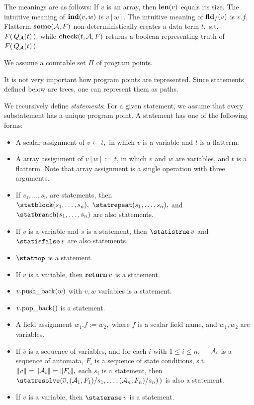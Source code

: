 \noindent
The meanings are as follows: If $ v $ is an array, then $ {\bf len}(v) $
equals its size. The intuitive meaning of $ {\bf ind}(v,w) $ is $ v[w]. $
The intuitive meaning of $ {\bf fld}_f(v) $ is $ v.f. $
Flatterm $ {\bf some}( {\cal A}, F ) $ non-deterministically creates a
data term $ t, $ s.t. $ F( \, Q_{\cal A}(t) \, ), $ while
$ {\bf check}( t, {\cal A}, F ) $ returns a boolean representing
truth of $ F( \, Q_{\cal A}(t) \, ). $
\begin{definition}
   \label{Def_program_point}
   We assume a countable set $ \Pi $ of program points.
\end{definition}
It is not very important how program points are represented.
Since statements defined below are trees, one can represent them as
paths.
\begin{definition}
   \label{Def_statement}
   We recursively define \emph{statements}:
   For a given statement, we assume that every substatement
   has a unique program point.
   A statement has one of the following forms:
   \begin{itemize}
   \item
      A scalar assignment of $ v \leftarrow t, $ in which $ v $ is a variable
      and $ t $ is a flatterm.
   \item
      A array assignment of $ v[w] := t $, in which
      $ v $ and $ w $ are variables,
      and $ t $ is a flatterm.
      Note that array assignment is a single operation
      with three arguments.
   \item
      If $ s_1, \ldots, s_n $ are statements, then
      $ \statblock(s_1, \ldots, s_n), \
        \statrepeat(s_1, \ldots, s_n), $ and 
        $ \statbranch(s_1, \ldots, s_n) $ are also statements.
   \item
      If $ v $ is a variable and
      $ s $ is a statement, then
      $ \statistrue \, v $ and $ \statisfalse \, v $ are also statements.
   \item
      $ \statnop $ is a statement.
  \item
      If $ v $ is a variable, then $ {\bf return} \, v  $ is a statement.
   \item
      $ v. {\rm push\_back}( w ) $
      with $ v,w $ variables is a statement.
   \item
      $ v. {\rm pop\_back}( ) $ is a statement.
   \item
      A field assignment $ w_1. f := w_2, $
      where $ f $ is a scalar field name,
      and $ w_1,w_2 $ are variables.
   \item
      If $ \overline{v} $ is a sequence of variables,
      and for each $ i $ with $ 1 \leq i \leq n, $ \ \
      $ {\cal A}_i $ is a sequence of automata,
      $ F_i $ is a sequence of state conditions,
      s.t. $ \| v \| = \| {\cal A}_i \| = \| F_i \|, $
      each $ s_i $ is a statement, then \\
      $ \statresolve( \overline{v}, ( {\cal A}_1, F_1 ) / s_1, \ldots,
                                    ( {\cal A}_n, F_n ) / s_n ) \, ) $
      is also a statement.
   \item
      If $ v $ is a variable, then $ \staterase \, v $ is a statement.
   \end{itemize}
\end{definition}

